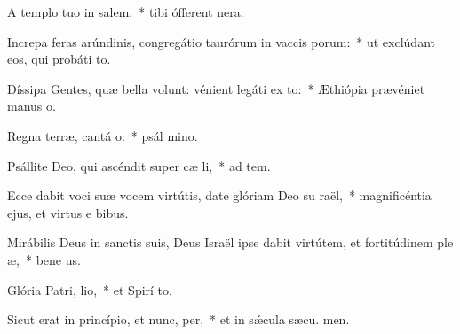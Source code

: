 \item A templo tuo in salem,~* tibi ófferent  nera.
\item Increpa feras arúndinis, congregátio taurórum in vaccis porum:~* ut exclúdant eos, qui probáti  to.
\item Díssipa Gentes, quæ bella volunt: vénient legáti ex to:~* Æthiópia prævéniet manus  o.
\item Regna terræ, cantá o:~* psál mino.
\item Psállite Deo, qui ascéndit super cæ li,~* ad tem.
\item Ecce dabit voci suæ vocem virtútis, date glóriam Deo su raël,~* magnificéntia ejus, et virtus e  bibus.
\item Mirábilis Deus in sanctis suis, Deus Israël ipse dabit virtútem, et fortitúdinem ple æ,~* bene us.
\item Glória Patri,  lio,~* et Spirí to.
\item Sicut erat in princípio, et nunc,  per,~* et in sǽcula sæcu. men.
